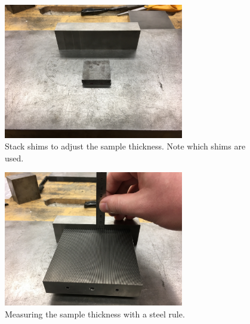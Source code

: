 \begin{figure}
	\centering
        \includegraphics[width=0.7\textwidth]{appendix_sample_prep/dds_thickness_blocks.jpg}
   	\caption{Stack shims to adjust the sample thickness. Note which shims are used.}
  	\label{Fig:dds_thickness_blocks}
\end{figure}

\begin{figure}
	\centering
        \includegraphics[width=0.7\textwidth]{appendix_sample_prep/dds_thickness_meas.jpg}
   	\caption{Measuring the sample thickness with a steel rule.}
  	\label{Fig:dds_thickness_meas}
\end{figure}

